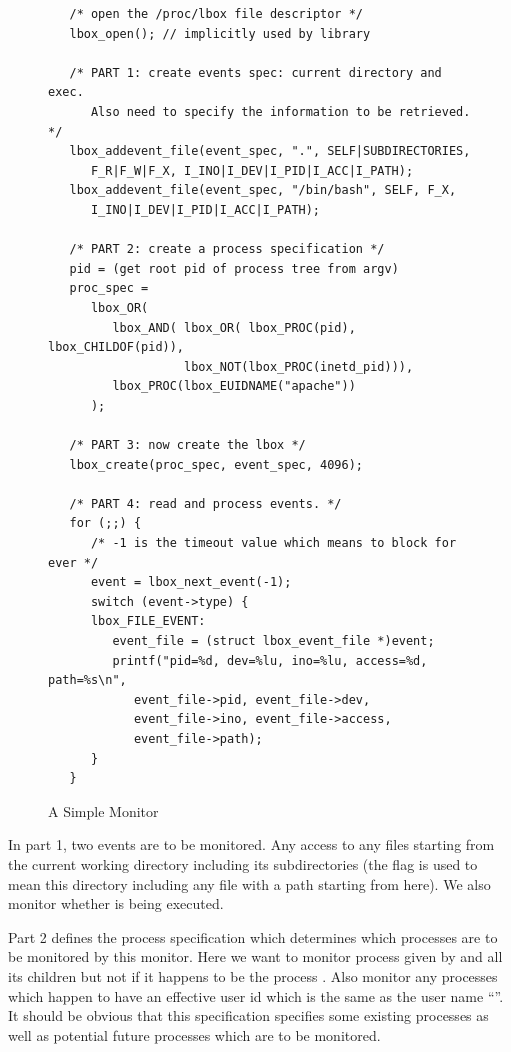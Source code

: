 \begin{figure}[htbp]
\small
\begin{center}
\begin{verbatim}
   /* open the /proc/lbox file descriptor */
   lbox_open(); // implicitly used by library

   /* PART 1: create events spec: current directory and exec.
      Also need to specify the information to be retrieved. */
   lbox_addevent_file(event_spec, ".", SELF|SUBDIRECTORIES,
      F_R|F_W|F_X, I_INO|I_DEV|I_PID|I_ACC|I_PATH);
   lbox_addevent_file(event_spec, "/bin/bash", SELF, F_X,
      I_INO|I_DEV|I_PID|I_ACC|I_PATH);

   /* PART 2: create a process specification */
   pid = (get root pid of process tree from argv)
   proc_spec = 
      lbox_OR(
         lbox_AND( lbox_OR( lbox_PROC(pid), lbox_CHILDOF(pid)), 
                   lbox_NOT(lbox_PROC(inetd_pid))),
         lbox_PROC(lbox_EUIDNAME("apache"))
      );

   /* PART 3: now create the lbox */
   lbox_create(proc_spec, event_spec, 4096);
 
   /* PART 4: read and process events. */
   for (;;) {
      /* -1 is the timeout value which means to block for ever */
      event = lbox_next_event(-1);
      switch (event->type) {
      lbox_FILE_EVENT:
         event_file = (struct lbox_event_file *)event;
         printf("pid=%d, dev=%lu, ino=%lu, access=%d, path=%s\n",
            event_file->pid, event_file->dev,
            event_file->ino, event_file->access,
            event_file->path);
      }
   }
\end{verbatim}
\end{center}
\caption{A Simple Monitor}
\label{fig:lbox-eg-prog}
\end{figure}

In part 1, two events are to be monitored. Any access to any files
starting from the current working directory including its subdirectories
(the  flag is used to mean 
this directory including any file with a path starting from here).
We also monitor whether  is being executed.

Part 2 defines the process specification which determines which processes
are to be monitored by this monitor.
Here we want to monitor process given by  and all its children
but not if it happens to be the process .
Also monitor any processes which happen to have an effective user
id which is the same as the user name ``''.
It should be obvious that this specification specifies some existing
processes as well as potential future processes which are to be monitored.

